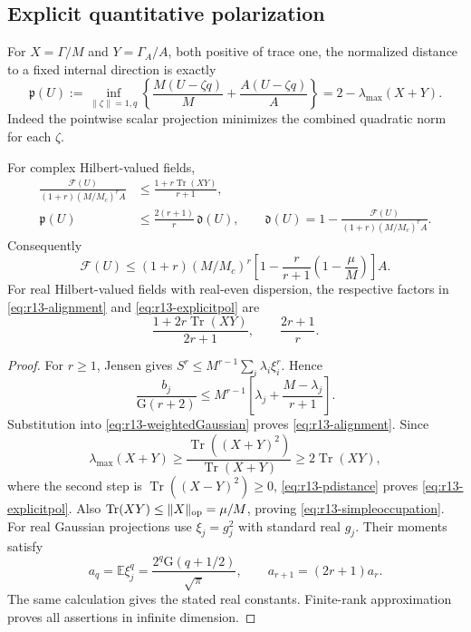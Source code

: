 \subsection{Explicit quantitative polarization}
For $X=\Gamma/M$ and $Y=\Gamma_A/A$, both positive of trace one, the
normalized distance to a fixed internal direction is exactly
\begin{equation}\label{eq:r13-pdistance}
 \mathfrak p(U):=\inf_{\|\zeta\|=1,q}
 \left\{\frac{M(U-\zeta q)}M+\frac{A(U-\zeta q)}A\right\}
 =2-\lambda_{\max}(X+Y).
\end{equation}
Indeed the pointwise scalar projection minimizes the combined quadratic
norm for each $\zeta$.

\begin{theorem}
\label{thm:r13-explicitpolarization}
For complex Hilbert-valued fields,
\begin{align}
 \frac{\mathcal F(U)}{(1+r)(M/M_c)^r A}
 &\le\frac{1+r\operatorname{Tr}(XY)}{r+1},
 \label{eq:r13-alignment}\\
 \mathfrak p(U)&\le\frac{2(r+1)}r\,\mathfrak d(U),
 \qquad
 \mathfrak d(U)=1-
  \frac{\mathcal F(U)}{(1+r)(M/M_c)^r A}.
 \label{eq:r13-explicitpol}
\end{align}
Consequently
\begin{equation}\label{eq:r13-simpleoccupation}
 \mathcal F(U)\le(1+r)(M/M_c)^r
 \left[1-\frac r{r+1}\left(1-\frac\mu M\right)\right]A.
\end{equation}
For real Hilbert-valued fields with real-even dispersion, the respective factors in
\eqref{eq:r13-alignment} and \eqref{eq:r13-explicitpol} are
\[
 \frac{1+2r\operatorname{Tr}(XY)}{2r+1},
 \qquad \frac{2r+1}{r}.
\]
\end{theorem}
\begin{proof}
For $r\ge1$, Jensen gives
$S^r\le M^{r-1}\sum_i\lambda_i\xi_i^r$. Hence
\[
 \frac{b_j}{\mathrm G(r+2)}
 \le M^{r-1}\left[\lambda_j+\frac{M-\lambda_j}{r+1}\right].
\]
Substitution into \eqref{eq:r13-weightedGaussian} proves
\eqref{eq:r13-alignment}. Since
\[
 \lambda_{\max}(X+Y)
 \ge\frac{\operatorname{Tr}((X+Y)^2)}{\operatorname{Tr}(X+Y)}
 \ge2\operatorname{Tr}(XY),
\]
where the second step is $\operatorname{Tr}((X-Y)^2)\ge0$,
\eqref{eq:r13-pdistance} proves \eqref{eq:r13-explicitpol}.
Also $\operatorname{Tr}(XY)\le\|X\|_{\rm op}=\mu/M$, proving
\eqref{eq:r13-simpleoccupation}.
For real Gaussian projections use $\xi_j=g_j^2$ with standard real
$g_j$. Their moments satisfy
\[
 a_q=\mathbb E\xi_j^q
 =\frac{2^q\mathrm G(q+1/2)}{\sqrt\pi},
 \qquad a_{r+1}=(2r+1)a_r.
\]
The same calculation gives the stated real constants. Finite-rank
approximation proves all assertions in infinite dimension.
\end{proof}

